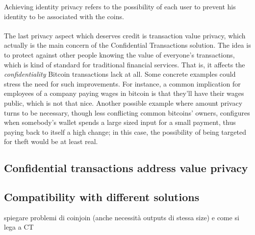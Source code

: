 Achieving identity privacy refers to the possibility of each user to prevent his identity to be associated with the coins.\\ \ \\
The last privacy aspect which deserves credit is transaction value privacy, which actually is the main concern of the Confidential Transactions \cite{Max15} solution. The idea is to protect against other people knowing the value of everyone's transactions, which is kind of standard for traditional financial services. That is, it affects the \textit{confidentiality} Bitcoin transactions lack at all. Some concrete examples could stress the need for such improvements. For instance, a common implication for employees of a company paying wages in bitcoin is that they'll have their wages public, which is not that nice. Another possible example where amount privacy turns to be necessary, though less conflicting common bitcoins' owners, configures when somebody's wallet spends a large sized input for a small payment, thus paying back to itself a high change; in this case, the possibility of being targeted for theft would be at least real.
\subsection{Confidential transactions address value privacy}
\subsection{Compatibility with different solutions}
spiegare problemi di coinjoin (anche necessità outputs di stessa  size) e come si lega a CT
